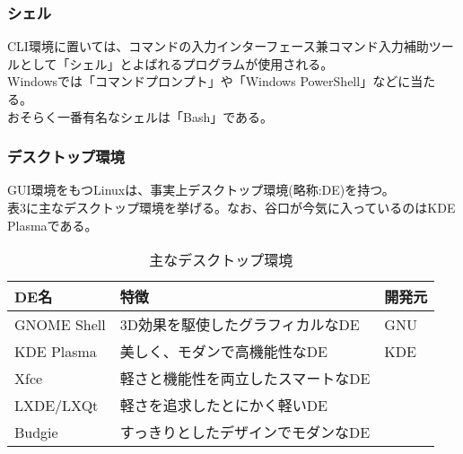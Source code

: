 \documentclass{ltjsarticle}
\begin{document}
\subsubsection{シェル}
CLI環境に置いては、コマンドの入力インターフェース兼コマンド入力補助ツールとして「シェル」とよばれるプログラムが使用される。\\
Windowsでは「コマンドプロンプト」や「Windows PowerShell」などに当たる。\\
おそらく一番有名なシェルは「Bash」である。
\subsubsection{デスクトップ環境}
GUI環境をもつLinuxは、事実上デスクトップ環境(略称:DE)を持つ。\\
表3に主なデスクトップ環境を挙げる。なお、谷口が今気に入っているのはKDE Plasmaである。\\
\begin{table}
    \caption{主なデスクトップ環境}
    \begin{center}
        \begin{tabular}{lll} \hline
            DE名 & 特徴 & 開発元 \\ \hline \hline
            GNOME Shell & 3D効果を駆使したグラフィカルなDE & GNU \\ \hline
            KDE Plasma & 美しく、モダンで高機能性なDE & KDE \\ \hline
            Xfce & 軽さと機能性を両立したスマートなDE \\ \hline
            LXDE/LXQt & 軽さを追求したとにかく軽いDE \\ \hline
            Budgie & すっきりとしたデザインでモダンなDE \\ \hline
        \end{tabular}
    \end{center}
\end{table}
\end{document}

